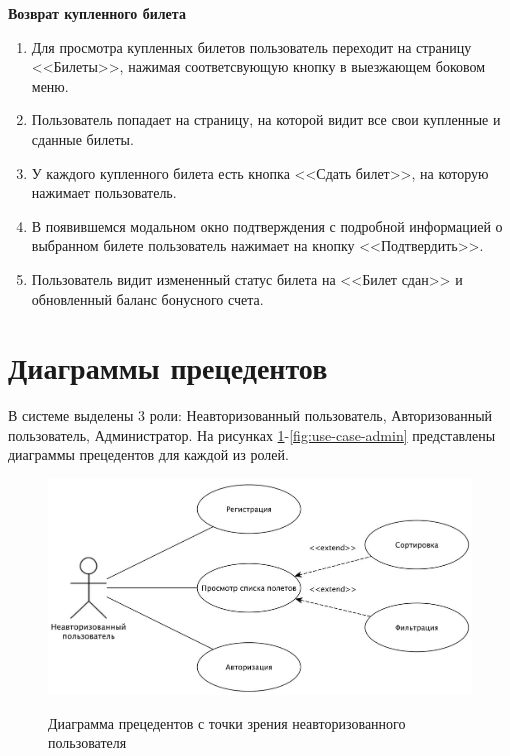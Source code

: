 \textbf{Возврат купленного билета}
\begin{enumerate}
	\item Для просмотра купленных билетов пользователь переходит на страницу <<Билеты>>, нажимая соответсвующую кнопку в выезжающем боковом меню.
	\item Пользователь попадает на страницу, на которой видит все свои купленные и сданные билеты.
	\item У каждого купленного билета есть кнопка <<Сдать билет>>, на которую нажимает пользователь.
	\item В появившемся модальном окно подтверждения с подробной информацией о выбранном билете пользователь нажимает на кнопку <<Подтвердить>>.
  \item Пользователь видит измененный статус билета на <<Билет сдан>> и обновленный баланс бонусного счета.
\end{enumerate}


\section{Диаграммы прецедентов}
В системе выделены 3 роли: Неавторизованный пользователь, Авторизованный пользователь, Администратор. На рисунках \ref{fig:use-case-non-auth}-\ref{fig:use-case-admin} представлены диаграммы прецедентов для каждой из ролей.

\begin{figure}[H]
	\begin{center}
		{\includegraphics[scale = 0.5]{img/use-case/non-auth-user.jpg}}
		\caption{Диаграмма прецедентов с точки зрения неавторизованного пользователя}
		\label{fig:use-case-non-auth}
	\end{center}
\end{figure}

